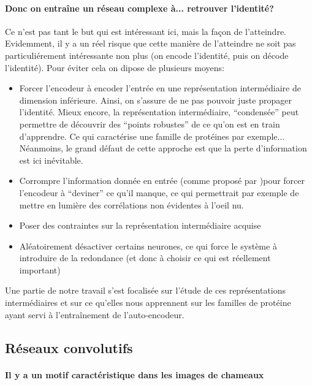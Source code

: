 \documentclass[a4paper,11pt, twocolumn]{article}
\begin{document}
\paragraph{Donc on entraîne un réseau complexe à... retrouver l'identité?}

Ce n'est pas tant le but qui est intéressant ici, mais la façon de l'atteindre.
Evidemment, il y a un réel risque que cette manière de l'atteindre ne soit pas
particuliérement intéressante non plus (on encode l'identité, puis on décode
l'identité). Pour éviter cela on dipose de plusieurs moyens:

\begin{itemize}
\item Forcer l'encodeur à encoder l'entrée en une représentation intermédiaire
  de dimension inférieure. Ainsi, on s'assure de ne pas pouvoir juste propager
  l'identité. Mieux encore, la représentation intermédiaire, ``condensée'' peut
  permettre de découvrir des ``points robustes'' de ce qu'on est en train
  d'apprendre. Ce qui caractérise une famille de protéines par exemple...
  Néanmoins, le grand défaut de cette approche est que la perte d'information
  est ici inévitable.
\item Corrompre l'information donnée en entrée (comme proposé par \cite{Vincent:2008:ECR:1390156.1390294})pour forcer l'encodeur à
  ``deviner'' ce qu'il manque, ce qui permettrait par exemple de mettre en
  lumière des corrélations non évidentes à l'oeil nu.
\item Poser des contraintes sur la représentation intermédiaire acquise
\item Aléatoirement désactiver certains neurones, ce qui force le système à
  introduire de la redondance (et donc à choisir ce qui est réellement important)
\end{itemize}

Une partie de notre travail s'est focalisée sur l'étude de ces représentations
intermédiaires et sur ce qu'elles nous apprennent sur les familles de protéine
ayant servi à l'entraînement de l'auto-encodeur.

\subsection{Réseaux convolutifs}

\paragraph{Il y a un motif caractéristique dans les images de chameaux}
\end{document}
